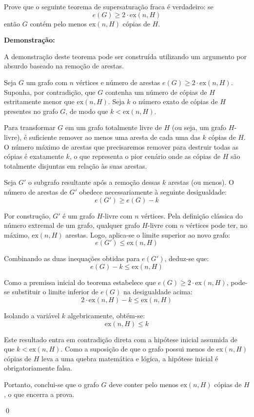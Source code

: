 \documentclass[12pt]{article}
\newenvironment{problem}[2][Exercício]{\begin{trivlist}
\item[\hskip \labelsep {\bfseries #1}\hskip \labelsep {\bfseries #2.}]}{\end{trivlist}}
\newenvironment{sol}
    {\textbf{Demonstração:}\emph{}
    }
    {
    \qed
    }
\begin{document}
\begin{problem}{12}
    Prove que o seguinte teorema de supersaturação fraca é verdadeiro: se
    \[
        e(G) \ge 2 \cdot \mathrm{ex}(n,H)
    \]
    então $G$ contém pelo menos $\mathrm{ex}(n,H)$ cópias de $H$.
\end{problem}
\begin{sol}
    A demonstração deste teorema pode ser construída utilizando um argumento por absurdo baseado na remoção de arestas.

    Seja $G$ um grafo com $n$ vértices e número de arestas $e(G) \ge 2 \cdot \mathrm{ex}(n,H)$. Suponha, por contradição, que $G$ contenha um número de cópias de $H$ estritamente menor que $\mathrm{ex}(n,H)$. Seja $k$ o número exato de cópias de $H$ presentes no grafo $G$, de modo que $k < \mathrm{ex}(n,H)$.

    Para transformar $G$ em um grafo totalmente livre de $H$ (ou seja, um grafo $H$-livre), é suficiente remover ao menos uma aresta de cada uma das $k$ cópias de $H$. O número máximo de arestas que precisaremos remover para destruir todas as cópias é exatamente $k$, o que representa o pior cenário onde as cópias de $H$ são totalmente disjuntas em relação às suas arestas.

    Seja $G'$ o subgrafo resultante após a remoção dessas $k$ arestas (ou menos). O número de arestas de $G'$ obedece necessariamente à seguinte desigualdade:
    \[
        e(G') \ge e(G) - k
    \]

    Por construção, $G'$ é um grafo $H$-livre com $n$ vértices. Pela definição clássica do número extremal de um grafo, qualquer grafo $H$-livre com $n$ vértices pode ter, no máximo, $\mathrm{ex}(n,H)$ arestas. Logo, aplica-se o limite superior ao novo grafo:
    \[
        e(G') \le \mathrm{ex}(n,H)
    \]

    Combinando as duas inequações obtidas para $e(G')$, deduz-se que:
    \[
        e(G) - k \le \mathrm{ex}(n,H)
    \]

    Como a premissa inicial do teorema estabelece que $e(G) \ge 2 \cdot \mathrm{ex}(n,H)$, pode-se substituir o limite inferior de $e(G)$ na desigualdade acima:
    \[
        2 \cdot \mathrm{ex}(n,H) - k \le \mathrm{ex}(n,H)
    \]

    Isolando a variável $k$ algebricamente, obtém-se:
    \[
        \mathrm{ex}(n,H) \le k
    \]

    Este resultado entra em contradição direta com a hipótese inicial assumida de que $k < \mathrm{ex}(n,H)$. Como a suposição de que o grafo possui menos de $\mathrm{ex}(n,H)$ cópias de $H$ leva a uma quebra matemática e lógica, a hipótese inicial é obrigatoriamente falsa.

    Portanto, conclui-se que o grafo $G$ deve conter pelo menos $\mathrm{ex}(n,H)$ cópias de $H$, o que encerra a prova.
\end{sol}
\end{document}
